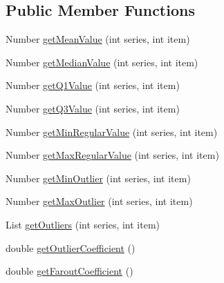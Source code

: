 \subsection*{Public Member Functions}
\begin{DoxyCompactItemize}
\item 
Number \mbox{\hyperlink{interfaceorg_1_1jfree_1_1data_1_1statistics_1_1_box_and_whisker_x_y_dataset_a8057b4eb916e10c4fa9d9bc4a5d19bde}{get\+Mean\+Value}} (int series, int item)
\item 
Number \mbox{\hyperlink{interfaceorg_1_1jfree_1_1data_1_1statistics_1_1_box_and_whisker_x_y_dataset_aaf7ccfc01f6781e32bf674818aba2a7f}{get\+Median\+Value}} (int series, int item)
\item 
Number \mbox{\hyperlink{interfaceorg_1_1jfree_1_1data_1_1statistics_1_1_box_and_whisker_x_y_dataset_a9594fa74639e0dde5c4464db4de1e65a}{get\+Q1\+Value}} (int series, int item)
\item 
Number \mbox{\hyperlink{interfaceorg_1_1jfree_1_1data_1_1statistics_1_1_box_and_whisker_x_y_dataset_aa0a7303f8abdc2cc56f5c4a1cdff2c49}{get\+Q3\+Value}} (int series, int item)
\item 
Number \mbox{\hyperlink{interfaceorg_1_1jfree_1_1data_1_1statistics_1_1_box_and_whisker_x_y_dataset_a11d53213d4eb15fd9691645b1b0edcb4}{get\+Min\+Regular\+Value}} (int series, int item)
\item 
Number \mbox{\hyperlink{interfaceorg_1_1jfree_1_1data_1_1statistics_1_1_box_and_whisker_x_y_dataset_a152f6bb587ba044108d7ddf68808f333}{get\+Max\+Regular\+Value}} (int series, int item)
\item 
Number \mbox{\hyperlink{interfaceorg_1_1jfree_1_1data_1_1statistics_1_1_box_and_whisker_x_y_dataset_a3008c9b45ede75485f3f1f8d3443dda3}{get\+Min\+Outlier}} (int series, int item)
\item 
Number \mbox{\hyperlink{interfaceorg_1_1jfree_1_1data_1_1statistics_1_1_box_and_whisker_x_y_dataset_a6591ebc4568691272437f1743610780d}{get\+Max\+Outlier}} (int series, int item)
\item 
List \mbox{\hyperlink{interfaceorg_1_1jfree_1_1data_1_1statistics_1_1_box_and_whisker_x_y_dataset_a7e0197e600e22c92f3201edc841aca0b}{get\+Outliers}} (int series, int item)
\item 
double \mbox{\hyperlink{interfaceorg_1_1jfree_1_1data_1_1statistics_1_1_box_and_whisker_x_y_dataset_a3df6c697a6acb9897a6bd728db18d578}{get\+Outlier\+Coefficient}} ()
\item 
double \mbox{\hyperlink{interfaceorg_1_1jfree_1_1data_1_1statistics_1_1_box_and_whisker_x_y_dataset_a83de87c9326c44163e2670b3b00d0280}{get\+Farout\+Coefficient}} ()
\end{DoxyCompactItemize}


